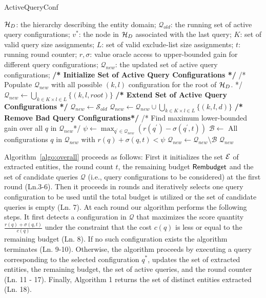\begin{algorithm}[h]
\footnotesize\caption{ActiveQueryConf}
\label{algo:updateactions}
\begin{algorithmic}[1]
 $\mathcal{H}_D$: the hierarchy describing the entity domain; $\mathcal{Q}_{old}$: the running set of active query configurations; $v^*$: the node in $\mathcal{H}_D$ associated with the last query; $K$: set of valid query size assignments; $L$: set of valid exclude-list size assignments; $t$: running round counter; $r,\sigma$: value oracle access to upper-bounded gain for different query configurations;
 $\mathcal{Q}_{new}$: the updated set of active query configurations;
	\STATE \textbf{/* Initialize Set of Active Query Configurations */}
	\STATE /* Populate ${\mathcal{Q}_{new}}$ with all possible $(k,l)$ configuration for the root of $\mathcal{H}_D$. */
	\STATE ${\mathcal{Q}_{new}} \leftarrow \bigcup_{k \in K \times l \in L} \{ (k,l,root) \}$
\ELSE
	\STATE \textbf{/* Extend Set of Active Query Configurations */}
	\STATE $\mathcal{Q}_{new} \leftarrow \mathcal{S}_{old}$
	\STATE $\mathcal{Q}_{new} \leftarrow \mathcal{Q}_{new} \cup \bigcup_{k \in K \times l \in L} \{(k,l,d)\}$
	\ENDFOR
	\STATE \textbf{/* Remove Bad Query Configurations*/}
	\STATE /* Find maximum lower-bounded gain over all $q$ in $\mathcal{Q}_{new}$*/
	\STATE $\psi \leftarrow \max_{q^{\prime} \in \mathcal{Q}_{new}} (r(q^{\prime}) - \sigma(q^{\prime},t))$  
	\STATE $\mathcal{B} \leftarrow$ All configurations $q$ in $\mathcal{Q}_{new}$ with $r(q) + \sigma(q,t) < \psi$
	\STATE $\mathcal{Q}_{new} \leftarrow \mathcal{Q}_{new} \setminus \mathcal{B}$
\ENDIF 
\RETURN $\mathcal{Q}_{new}$
\end{algorithmic}
\end{algorithm}


Algorithm~\ref{algo:overall} proceeds as follows: First it initializes the set $\mathcal{E}$ of extracted entities, the round count $t$, the remaining budget ${\sf Rembudget}$ and the set of candidate queries $\mathcal{Q}$ (i.e., query configurations to be considered) at the first round (Ln.3-6). Then it proceeds in rounds and iteratively selects one query configuration to be used until the total budget is utilized or the set of candidate queries is empty (Ln. 7). At each round our algorithm performs the following steps. It first detects a configuration in $\mathcal{Q}$ that maximizes the score quantity $\frac{r(q) + \sigma(q,t)}{c(q)}$ under the constraint that the cost $c(q)$ is less or equal to the remaining budget (Ln. 8). If no such configuration exists the algorithm terminates (Ln. 9-10). Otherwise, the algorithm proceeds by executing a query corresponding to the selected configuration $q^*$, updates the set of extracted entities, the remaining budget, the set of active queries, and the round counter (Ln. 11 - 17). Finally, Algorithm 1 returns the set of distinct entities extracted (Ln. 18). 

